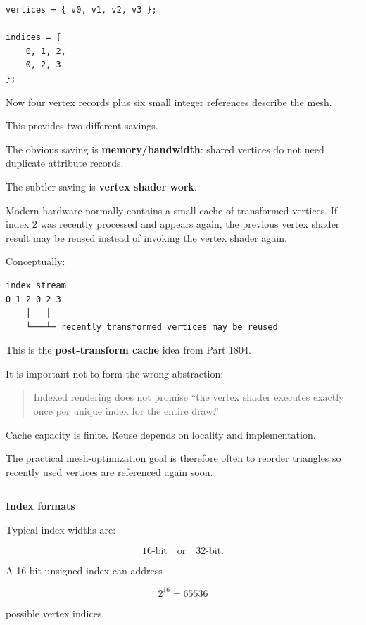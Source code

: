 \begin{verbatim}
vertices = { v0, v1, v2, v3 };

indices = {
    0, 1, 2,
    0, 2, 3
};
\end{verbatim}

Now four vertex records plus six small integer references describe the mesh.

This provides two different savings.

The obvious saving is \textbf{memory/bandwidth}: shared vertices do not need duplicate attribute records.

The subtler saving is \textbf{vertex shader work}.

Modern hardware normally contains a small cache of transformed vertices. If index \(2\) was recently processed and appears again, the previous vertex shader result may be reused instead of invoking the vertex shader again.

Conceptually:

\begin{verbatim}
index stream
0 1 2 0 2 3
    │   │
    └───┴─ recently transformed vertices may be reused
\end{verbatim}

This is the \textbf{post-transform cache} idea from Part 1804.

It is important not to form the wrong abstraction:

\begin{quote}
Indexed rendering does not promise ``the vertex shader executes exactly once per unique index for the entire draw.''
\end{quote}

Cache capacity is finite. Reuse depends on locality and implementation.

The practical mesh-optimization goal is therefore often to reorder triangles so recently used vertices are referenced again soon.

\begin{center}\rule{0.5\linewidth}{0.5pt}\end{center}

\textbf{Index formats}

Typical index widths are:

\[
16\text{-bit} \quad \text{or} \quad 32\text{-bit}.
\]

A 16-bit unsigned index can address

\[
2^{16}=65536
\]

possible vertex indices.

